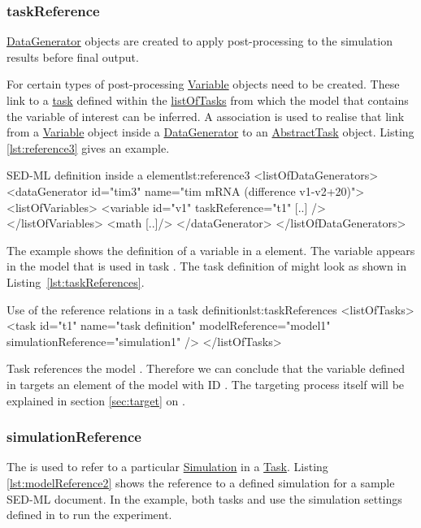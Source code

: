 \subsubsection{taskReference}
\label{sec:taskReference}
\hyperref[class:dataGenerator]{DataGenerator} objects are created to apply post-processing to the simulation results before final output. 

For certain types of post-processing \hyperref[class:variable]{Variable} objects need to be created.
These link to a \hyperref[class:abstractTask]{task} defined within the \hyperref[sec:listOfTasks]{listOfTasks} from which the model that contains the variable of interest can be inferred. 
A  association is used to realise that link from a \hyperref[class:variable]{Variable} object inside a \hyperref[class:dataGenerator]{DataGenerator} to an \hyperref[class:abstractTask]{AbstractTask} object. 
Listing \ref{lst:reference3} gives an example.

\begin{myXmlLst}{SED-ML  definition inside a  element}{lst:reference3}
<listOfDataGenerators>
 <dataGenerator id="tim3" name="tim mRNA (difference v1-v2+20)">
  <listOfVariables>
   <variable id="v1" taskReference="t1" [..] />
  </listOfVariables>
  <math [..]/>
 </dataGenerator>
</listOfDataGenerators>
\end{myXmlLst}

The example shows the definition of a variable  in a  element. The variable appears in the model that is used in task . The task definition of  might look as shown in Listing~\ref{lst:taskReferences}.
\begin{myXmlLst}{Use of the reference relations in a task definition}{lst:taskReferences}
<listOfTasks>
  <task id="t1" name="task definition" modelReference="model1" simulationReference="simulation1" />
</listOfTasks>
\end{myXmlLst}
Task  references the model . Therefore we can conclude that the variable  defined in  targets an element of the model with ID . The targeting process itself will be explained in section \ref{sec:target} on .


\subsubsection{simulationReference}
\label{sec:simulationReference}
The  is used to refer to a particular \hyperref[class:simulation]{Simulation} in a \hyperref[class:task]{Task}. Listing \ref{lst:modelReference2} shows the reference to a defined simulation for a sample SED-ML document. In the example, both tasks  and  use the simulation settings defined in  to run the experiment.



